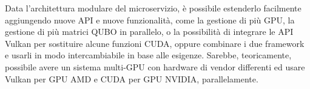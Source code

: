 
Data l'architettura modulare del microservizio, è possibile estenderlo facilmente aggiungendo nuove \gls{API} e nuove funzionalità, come la gestione di più \gls{GPU}, la gestione di più matrici \gls{QUBO} in parallelo, o la possibilità di integrare le \gls{API} Vulkan per sostituire alcune funzioni \gls{CUDA}, oppure combinare i due framework e usarli in modo intercambiabile in base alle esigenze. Sarebbe, teoricamente, possibile avere un sistema multi-GPU con hardware di vendor differenti ed usare Vulkan per \gls{GPU} AMD e \gls{CUDA} per \gls{GPU} NVIDIA, parallelamente.


